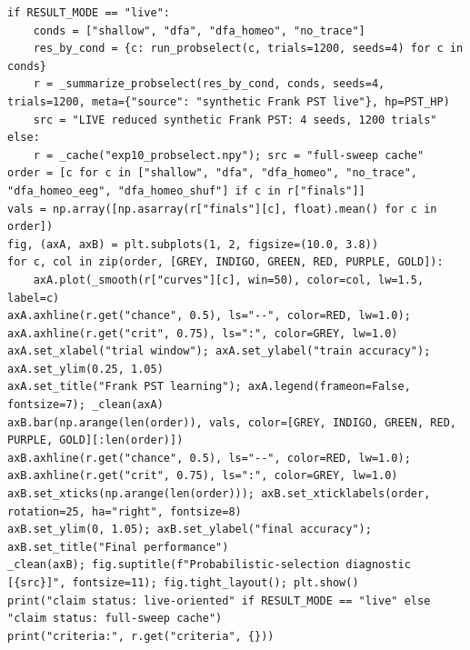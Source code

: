 \begin{lstlisting}[caption={05\_biological\_grounding.ipynb code cell 3},label={lst:mrl-nb-05-biological-grounding-3}]
if RESULT_MODE == "live":
    conds = ["shallow", "dfa", "dfa_homeo", "no_trace"]
    res_by_cond = {c: run_probselect(c, trials=1200, seeds=4) for c in conds}
    r = _summarize_probselect(res_by_cond, conds, seeds=4, trials=1200, meta={"source": "synthetic Frank PST live"}, hp=PST_HP)
    src = "LIVE reduced synthetic Frank PST: 4 seeds, 1200 trials"
else:
    r = _cache("exp10_probselect.npy"); src = "full-sweep cache"
order = [c for c in ["shallow", "dfa", "dfa_homeo", "no_trace", "dfa_homeo_eeg", "dfa_homeo_shuf"] if c in r["finals"]]
vals = np.array([np.asarray(r["finals"][c], float).mean() for c in order])
fig, (axA, axB) = plt.subplots(1, 2, figsize=(10.0, 3.8))
for c, col in zip(order, [GREY, INDIGO, GREEN, RED, PURPLE, GOLD]):
    axA.plot(_smooth(r["curves"][c], win=50), color=col, lw=1.5, label=c)
axA.axhline(r.get("chance", 0.5), ls="--", color=RED, lw=1.0); axA.axhline(r.get("crit", 0.75), ls=":", color=GREY, lw=1.0)
axA.set_xlabel("trial window"); axA.set_ylabel("train accuracy"); axA.set_ylim(0.25, 1.05)
axA.set_title("Frank PST learning"); axA.legend(frameon=False, fontsize=7); _clean(axA)
axB.bar(np.arange(len(order)), vals, color=[GREY, INDIGO, GREEN, RED, PURPLE, GOLD][:len(order)])
axB.axhline(r.get("chance", 0.5), ls="--", color=RED, lw=1.0); axB.axhline(r.get("crit", 0.75), ls=":", color=GREY, lw=1.0)
axB.set_xticks(np.arange(len(order))); axB.set_xticklabels(order, rotation=25, ha="right", fontsize=8)
axB.set_ylim(0, 1.05); axB.set_ylabel("final accuracy"); axB.set_title("Final performance")
_clean(axB); fig.suptitle(f"Probabilistic-selection diagnostic [{src}]", fontsize=11); fig.tight_layout(); plt.show()
print("claim status: live-oriented" if RESULT_MODE == "live" else "claim status: full-sweep cache")
print("criteria:", r.get("criteria", {}))
\end{lstlisting}

